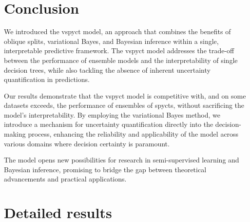 \documentclass[3p,review,authoryear]{elsarticle}
\begin{document}
\section{Conclusion}

We introduced the \gls{vspyct} model, an approach that combines the benefits of oblique splits, variational Bayes, and Bayesian inference within a single, interpretable predictive framework.
The \gls{vspyct} model addresses the trade-off between the performance of ensemble models and the interpretability of single decision trees, while also tackling the absence of inherent uncertainty quantification in predictions.

Our results demonstrate that the \gls{vspyct} model is competitive with, and on some datasets exceeds, the performance of ensembles of \glspl{spyct}, without sacrificing the model's interpretability.
By employing the variational Bayes method, we introduce a mechanism for uncertainty quantification directly into the decision-making process, enhancing the reliability and applicability of the model across various domains where decision certainty is paramount.

The model opens new possibilities for research in semi-supervised learning and Bayesian inference, promising to bridge the gap between theoretical advancements and practical applications.

\appendix
\section{Detailed results}
\label{app:res}
\end{document}
